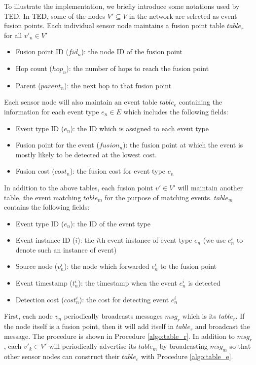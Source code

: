 To illustrate the implementation, we briefly introduce some notations used by TED. In TED, some of the nodes \(V'\subseteq V\) in the network are selected as event fusion points. Each individual sensor node maintains a fusion point table \(table_r\) for all \(v'_n\in V'\)
\begin{itemize}
\item Fusion point ID (\(fid_n\)): the node ID of the fusion point
\item	Hop count (\(hop_n\)): the number of hops to reach the fusion point
\item	Parent (\(parent_n\)): the next hop to that fusion point
\end{itemize}
Each sensor node will also maintain an event table \(table_e\) containing the information for each event type \(e_n\in E\) which includes the following fields:
\begin{itemize}
\item Event type ID (\(e_n\)): the ID which is assigned to each event type
\item Fusion point for the event (\(fusion_n\)): the fusion point at which the event is mostly likely to be detected at the lowest cost.
\item Fusion cost (\(cost_n\)): the fusion cost for event type \(e_n\)
\end{itemize}
In addition to the above tables, each fusion point \(v'\in V'\) will maintain another table, the event matching \(table_m\) for the purpose of matching events. \(table_m\) contains the following fields:
\begin{itemize}
\item Event type ID (\(e_n\)): the ID of the event type
\item Event instance ID (\(i\)): the \(i\)th event instance of event type \(e_n\) (we use \(e_n^i\) to denote such an instance of event)
\item Source node (\(v_n^i\)): the node which forwarded \(e_n^i\) to the fusion point
\item Event timestamp (\(t_n^i\)): the timestamp when the event \(e_n^i\) is detected
\item Detection cost (\(cost_n^i\)): the cost for detecting event \(e_n^i\)
\end{itemize}

First, each node \(v_n\) periodically broadcasts messages \(msg_r\) which is its \(table_r\). If the node itself is a fusion point, then it will add itself in \(table_r\) and broadcast the message. The procedure is shown in Procedure \ref{algo:table_r}. In addition to \(msg_r\), each \(v'_k\in V'\) will periodically advertise its \(table_m\) by broadcasting \(msg_m\) so that other sensor nodes can construct their \(table_e\) with Procedure \ref{algo:table_e}.

